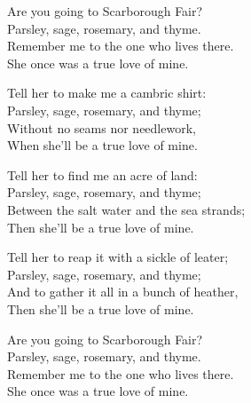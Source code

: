 
\ve{}
Are you going to Scarborough Fair?\\
Parsley, sage, rosemary, and thyme.\\
Remember me to the one who lives there.\\
She once was a true love of mine. 

\ve{}
Tell her to make me a cambric shirt:\\
Parsley, sage, rosemary, and thyme;\\
Without no seams nor needlework,\\
When she'll be a true love of mine. 

\ve{}
Tell her to find me an acre of land:\\
Parsley, sage, rosemary, and thyme;\\
Between the salt water and the sea strands;\\
Then she'll be a true love of mine. 

\ve{}
Tell her to reap it with a sickle of leater;\\
Parsley, sage, rosemary, and thyme;\\
And to gather it all in a bunch of heather,\\
Then she'll be a true love of mine.

\ve{}
Are you going to Scarborough Fair?\\
Parsley, sage, rosemary, and thyme.\\
Remember me to the one who lives there.\\
She once was a true love of mine. 

\esong